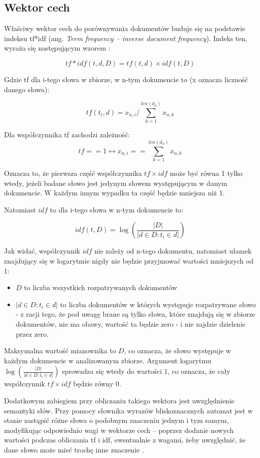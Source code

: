 \documentclass{article}
\begin{document}
\subsection{Wektor cech} \label{feature_vec_section}

Właściwy wektor cech do porównywania dokumentów buduje się na podstawie indeksu tf*idf (ang. \textit{Term frequency – inverse document frequency}). Indeks ten, wyraża się następującym wzorem :

\[ tf*idf(t, d, D) = tf(t, d)\times idf(t, D) \]

Gdzie tf dla i-tego słowa w zbiorze, w n-tym dokumencie to (x oznacza liczność danego słowa):

\[ tf(t_{i}, d) = x_{n,i} / \sum_{k=1}^{len(d_{n})}x_{n,k} \]

Dla współczynnika tf zachodzi zależność: \[ tf == 1 \leftrightarrow x_{n,i} == \sum_{k=1}^{len(d_{n})}x_{n,k} \]

Oznacza to, że pierwsza część współczynnika $tf \times idf$ może być równa 1 tylko wtedy, jeżeli badane słowo jest jedynym słowem występującym w danym dokumencie. W każdym innym wypadku ta część będzie mniejsza niż 1. 

Natomiast $idf$ to dla i-tego słowa w n-tym dokumencie to: 

\[ idf(t, D) = \log(\frac{|D|}{|d \in D: t_{i} \in d|})  \]

Jak widać, współczynnik $idf$ nie zależy od n-tego dokumentu, natomiast ułamek znajdujący się w logarytmie nigdy nie będzie przyjmować wartości mniejszych od 1:
\begin{itemize}
	\item $D$ to liczba wszystkich rozpatrywanych dokumentów
	\item $|d \in D: t_{i} \in d|$ to liczba dokumentów w których występuje rozpatrywane słowo - z racji tego, że pod uwagę brane są tylko słowa, które znajdują się w zbiorze dokumentów, nie ma obawy, wartość ta będzie zero - i nie zajdzie dzielenie przez zero. 
\end{itemize}
Maksymalna wartość mianownika to $D$, co oznacza, że słowo występuje w każdym dokumencie w analizowanym zbiorze. Argument logarytmu $\log(\frac{|D|}{|d \in D: t_{i} \in d|})$ sprowadza się wtedy do wartości $1$, co oznacza, że cały współczynnik $tf \times idf$ będzie równy 0.

Dodatkowym zabiegiem przy obliczaniu takiego wektora jest uwzględnienie semantyki słów. Przy pomocy słownika wyrazów bliskoznacznych automat jest w stanie zastąpić różne słowa o podobnym znaczeniu jednym i tym samym, modyfikując odpowiednio wagi w wektorze cech – poprzez dodanie nowych wartości podczas obliczania tf i idf, ewentualnie z wagami, żeby uwzględnić, że dane słowo może mieć trochę inne znaczenie .
\end{document}
